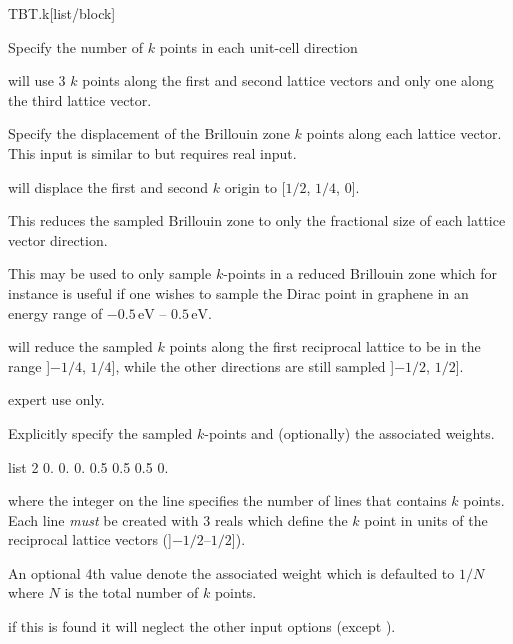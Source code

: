 \begin{fdfentry}{TBT.k}[list/block]
\begin{fdfoptions}

    Specify the number of $k$ points in each unit-cell direction

     will use 3 $k$ points along the first and
    second lattice vectors and only one along the third lattice
    vector.



    Specify the displacement of the Brillouin zone $k$ points along
    each lattice vector. This input is similar to  but
    requires real input.

     will displace the first and
    second $k$ origin to [$1/2$, $1/4$, $0$].


    \option[size]%

    This reduces the sampled Brillouin zone to only the fractional
    size of each lattice vector direction.

    This may be used to only sample $k$-points in a reduced Brillouin
    zone which for instance is useful if one wishes to sample the
    Dirac point in graphene in an energy range of $-0.5\,\mathrm{eV}$
    -- $0.5\,\mathrm{eV}$. 

     will reduce the sampled $k$ points along the
    first reciprocal lattice to be in the range ]$-1/4$, $1/4$], while
    the other directions are still sampled ]$-1/2$, $1/2$].

    \note expert use only.

    \option[list]%

    Explicitly specify the sampled $k$-points and (optionally) the
    associated weights.
    \begin{fdfexample}
  list 2
    0.  0.  0.  0.5
    0.5 0.5 0.
    \end{fdfexample}
    where the integer on the  line specifies the number of
    lines that contains $k$ points. Each line \emph{must} be created
    with $3$ reals which define the $k$ point in units of the
    reciprocal lattice vectors (]$-1/2$--$1/2$]). 

    An optional 4th value denote the associated weight which is
    defaulted to $1/N$ where $N$ is the total number of $k$ points.

    \note if this is found it will neglect the other input options
    (except ).


\end{fdfoptions}
\end{fdfentry}
